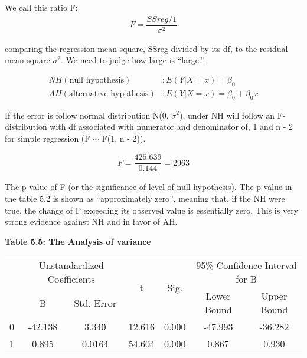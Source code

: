 \documentclass{article}
\begin{document}
    We call this ratio F:
    \begin{align}
        F = \dfrac{SSreg / 1}{\sigma^{2}} \nonumber
    \end{align}
    
    comparing the regression mean square, SSreg divided by its df, to the residual mean square $\sigma^{2}$. We need to judge  how large is “large.”. 

    \begin{align}
       NH (\text{null hypothesis}) &:  E(Y | X = x) = \beta_{0} \nonumber \\ 
       AH (\text{alternative hypothesis}) &:  E(Y | X = x) = \beta_{0} + \beta_{0}x \nonumber 
    \end{align}
    
    If the error is follow normal distribution N(0, $\sigma^{2}$), under NH will follow an F-distribution with df associated with numerator and denominator of, 1 and n - 2 for simple regression (F $\sim$ F(1, n - 2)). 
    
    \begin{align}
       F = \dfrac{425.639}{0.144} = 2963 \nonumber
    \end{align} 
    
    The p-value of F (or the significance of level of null hypothesis). The p-value in the table 5.2 is shown as “approximately zero”, meaning that, if the NH were true, the change of F exceeding its observed value is essentially zero. This is very strong evidence against NH and in favor of AH.
    
    \begin{center}
        \textbf{Table 5.5: The Analysis of variance}

        \begin{tabular}{|c|c|c|c|c|c|c|}
        \hline
        \multirow{2}{*}{} & \multicolumn{2}{c|}{Unstandardized Coefficients} & \multirow{2}{*}{t} & \multirow{2}{*}{Sig.} & \multicolumn{2}{c|}{95\% Confidence Interval for B} \\ \cline{2-3} \cline{6-7} 
                          & B                     & Std. Error              &                    &                       & Lower Bound              & Upper Bound              \\ \hline
        0                 & -42.138               & 3.340                   & 12.616                & 0.000                     & -47.993                  & -36.282                  \\ \hline
        1                 & 0.895                 & 0.0164                  & 54.604                  & 0.000                     & 0.867                    & 0.930                    \\ \hline
        \end{tabular}
    \end{center}
    
\end{document}
